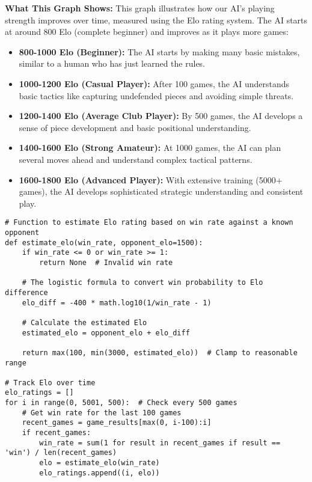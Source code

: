 \documentclass[11pt]{article}
\begin{document}
\textbf{What This Graph Shows:} This graph illustrates how our AI's playing strength improves over time, measured using the Elo rating system. The AI starts at around 800 Elo (complete beginner) and improves as it plays more games:

\begin{itemize}
    \item \textbf{800-1000 Elo (Beginner):} The AI starts by making many basic mistakes, similar to a human who has just learned the rules.
    
    \item \textbf{1000-1200 Elo (Casual Player):} After 100 games, the AI understands basic tactics like capturing undefended pieces and avoiding simple threats.
    
    \item \textbf{1200-1400 Elo (Average Club Player):} By 500 games, the AI develops a sense of piece development and basic positional understanding.
    
    \item \textbf{1400-1600 Elo (Strong Amateur):} At 1000 games, the AI can plan several moves ahead and understand complex tactical patterns.
    
    \item \textbf{1600-1800 Elo (Advanced Player):} With extensive training (5000+ games), the AI develops sophisticated strategic understanding and consistent play.
\end{itemize}

\begin{tcolorbox}[colback=green!5!white,colframe=green!75!black,title=Code Example: Estimating Elo Rating]
\begin{verbatim}
# Function to estimate Elo rating based on win rate against a known opponent
def estimate_elo(win_rate, opponent_elo=1500):
    if win_rate <= 0 or win_rate >= 1:
        return None  # Invalid win rate
    
    # The logistic formula to convert win probability to Elo difference
    elo_diff = -400 * math.log10(1/win_rate - 1)
    
    # Calculate the estimated Elo
    estimated_elo = opponent_elo + elo_diff
    
    return max(100, min(3000, estimated_elo))  # Clamp to reasonable range

# Track Elo over time
elo_ratings = []
for i in range(0, 5001, 500):  # Check every 500 games
    # Get win rate for the last 100 games
    recent_games = game_results[max(0, i-100):i]
    if recent_games:
        win_rate = sum(1 for result in recent_games if result == 'win') / len(recent_games)
        elo = estimate_elo(win_rate)
        elo_ratings.append((i, elo))
\end{verbatim}
\end{tcolorbox}
\end{document}

